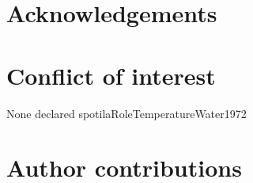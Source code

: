 \section*{Acknowledgements}
\label{sec:acknowl1}

\section*{Conflict of interest}
\label{sec:conflict1}

None declared
spotilaRoleTemperatureWater1972
\section*{Author contributions}
\label{sec:author1}

\cleardoublepage

\begin{otherlanguage}{english}

\end{otherlanguage}
